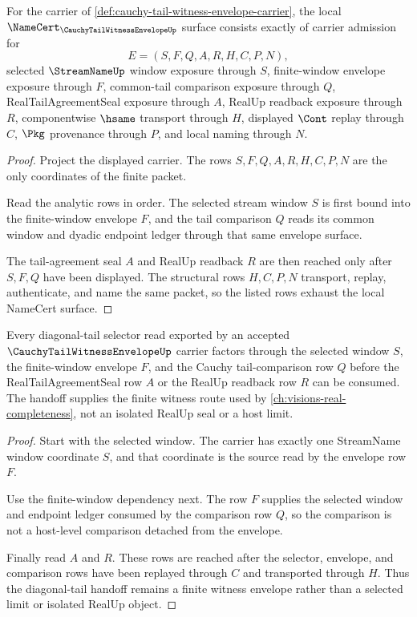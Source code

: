 \begin{theorem}
\label{thm:cauchy-tail-witness-envelope-namecert-obligations}
For the carrier of \autoref{def:cauchy-tail-witness-envelope-carrier}, the local $\NameCert_{\CauchyTailWitnessEnvelopeUp}$ surface consists exactly of carrier admission for
$$
E=(S,F,Q,A,R,H,C,P,N),
$$
selected $\StreamNameUp$ window exposure through $S$, finite-window envelope exposure through $F$, common-tail comparison exposure through $Q$, RealTailAgreementSeal exposure through $A$, RealUp readback exposure through $R$, componentwise $\hsame$ transport through $H$, displayed $\Cont$ replay through $C$, $\Pkg$ provenance through $P$, and local naming through $N$.
\end{theorem}
\begin{proof}
Project the displayed carrier. The rows $S,F,Q,A,R,H,C,P,N$ are the only coordinates of the finite packet.

Read the analytic rows in order. The selected stream window $S$ is first bound into the finite-window envelope $F$, and the tail comparison $Q$ reads its common window and dyadic endpoint ledger through that same envelope surface.

The tail-agreement seal $A$ and RealUp readback $R$ are then reached only after $S,F,Q$ have been displayed. The structural rows $H,C,P,N$ transport, replay, authenticate, and name the same packet, so the listed rows exhaust the local NameCert surface.
\end{proof}

\begin{theorem}
\label{thm:cauchy-tail-witness-envelope-selector-handoff}
Every diagonal-tail selector read exported by an accepted $\CauchyTailWitnessEnvelopeUp$ carrier factors through the selected window $S$, the finite-window envelope $F$, and the Cauchy tail-comparison row $Q$ before the RealTailAgreementSeal row $A$ or the RealUp readback row $R$ can be consumed. The handoff supplies the finite witness route used by \autoref{ch:visions-real-completeness}, not an isolated RealUp seal or a host limit.
\end{theorem}
\begin{proof}
Start with the selected window. The carrier has exactly one StreamName window coordinate $S$, and that coordinate is the source read by the envelope row $F$.

Use the finite-window dependency next. The row $F$ supplies the selected window and endpoint ledger consumed by the comparison row $Q$, so the comparison is not a host-level comparison detached from the envelope.

Finally read $A$ and $R$. These rows are reached after the selector, envelope, and comparison rows have been replayed through $C$ and transported through $H$. Thus the diagonal-tail handoff remains a finite witness envelope rather than a selected limit or isolated RealUp object.
\end{proof}

